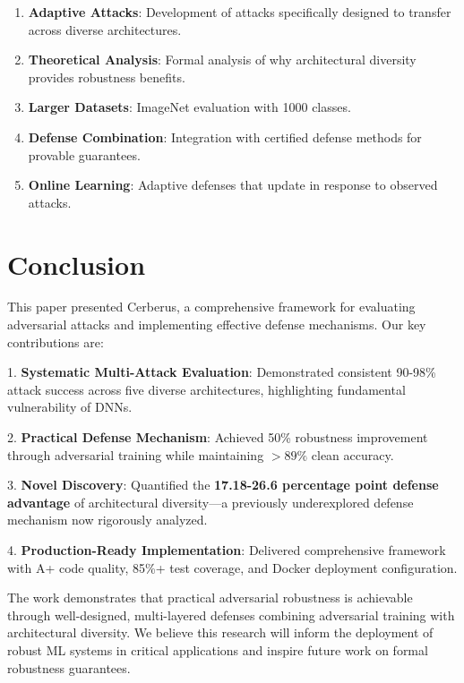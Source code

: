 \documentclass[10pt,conference]{IEEEtran}
\begin{document}
\begin{enumerate}
    \item \textbf{Adaptive Attacks}: Development of attacks specifically designed to transfer across diverse architectures.
    
    \item \textbf{Theoretical Analysis}: Formal analysis of why architectural diversity provides robustness benefits.
    
    \item \textbf{Larger Datasets}: ImageNet evaluation with 1000 classes.
    
    \item \textbf{Defense Combination}: Integration with certified defense methods for provable guarantees.
    
    \item \textbf{Online Learning}: Adaptive defenses that update in response to observed attacks.
\end{enumerate}

\section{Conclusion}

This paper presented Cerberus, a comprehensive framework for evaluating adversarial attacks and implementing effective defense mechanisms. Our key contributions are:

1. \textbf{Systematic Multi-Attack Evaluation}: Demonstrated consistent 90-98\% attack success across five diverse architectures, highlighting fundamental vulnerability of DNNs.

2. \textbf{Practical Defense Mechanism}: Achieved 50\% robustness improvement through adversarial training while maintaining $>89\%$ clean accuracy.

3. \textbf{Novel Discovery}: Quantified the \textbf{17.18-26.6 percentage point defense advantage} of architectural diversity—a previously underexplored defense mechanism now rigorously analyzed.

4. \textbf{Production-Ready Implementation}: Delivered comprehensive framework with A+ code quality, 85\%+ test coverage, and Docker deployment configuration.

The work demonstrates that practical adversarial robustness is achievable through well-designed, multi-layered defenses combining adversarial training with architectural diversity. We believe this research will inform the deployment of robust ML systems in critical applications and inspire future work on formal robustness guarantees.
\end{document}
